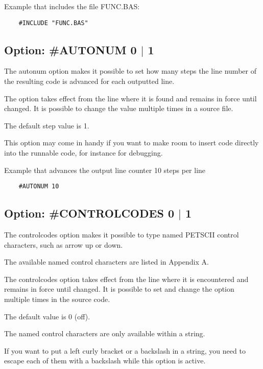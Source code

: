 \documentclass{article}
\begin{document}
        Example that includes the file FUNC.BAS:
        \begin{verbatim}
    #INCLUDE "FUNC.BAS"
        \end{verbatim}    

    \subsection{Option: \#AUTONUM 0 $|$ 1}

        The autonum option makes it possible to set how many
        steps the line number of the resulting code is
        advanced for each outputted line.

        The option takes effect from the line where it is
        found and remains in force until changed. It is
        possible to change the value multiple times in a
        source file.

        The default step value is 1.

        This option may come in handy if you want to make
        room to insert code directly into the runnable code,
        for instance for debugging.
        
        Example that advances the output line counter 10 steps per line
        \begin{verbatim}
    #AUTONUM 10
        \end{verbatim}

    \subsection{Option: \#CONTROLCODES 0 $|$ 1}
        The controlcodes option makes it possible to type
        named PETSCII control characters, such as arrow up or
        down.

        The available named control characters are listed in
        Appendix A.

        The controlcodes option takes effect from the line
        where it is encountered and remains in force until
        changed. It is possible to set and change the
        option multiple times in the source code.

        The default value is 0 (off).

        The named control characters are only available
        within a string.

        If you want to put a left curly bracket or a 
        backslash in a string, you need to escape each of them with 
        a backslash while this option is active.
\end{document}
